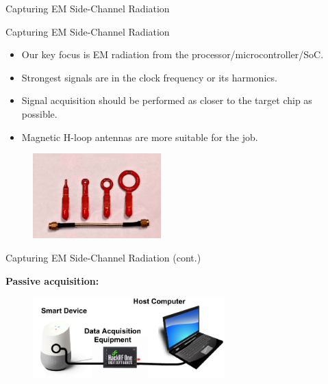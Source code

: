 \documentclass[handout]{beamer}
\begin{document}
\begin{frame}{}  

	\begin{block}{Capturing EM Side-Channel Radiation}
	\end{block}

\end{frame}


\begin{frame}{Capturing EM Side-Channel Radiation}  

	\begin{itemize}
	\footnotesize
	\item Our key focus is EM radiation from the processor/microcontroller/SoC.
		\vspace{5pt}
	\item Strongest signals are in the clock frequency or its harmonics.
		\vspace{5pt}
	\item Signal acquisition should be performed as closer to the target chip as possible.
		\vspace{5pt}
	\item Magnetic H-loop antennas are more suitable for the job.
	\end{itemize}


	\begin{figure}
		\includegraphics[width=140pt]{figures/antenna-kit-small.jpg}
	\end{figure}

\end{frame}



\begin{frame}{Capturing EM Side-Channel Radiation (cont.)}  

\footnotesize
\textbf{Passive acquisition:}

	\begin{figure}
		\includegraphics[width=210pt]{figures/hardware-setup.pdf}
	\end{figure}

\end{frame}
\end{document}
